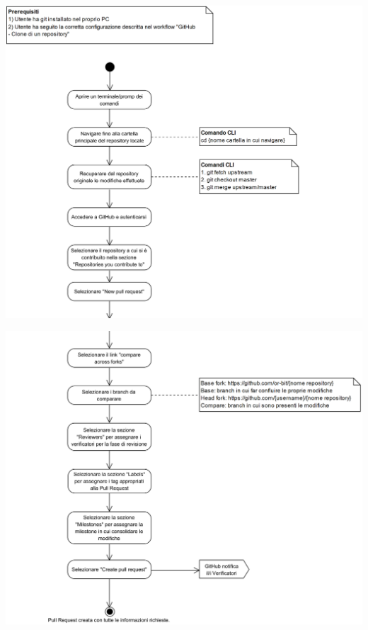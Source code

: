 \begin{center}
	\includegraphics[width=15cm]{./DiagrammiProcedure/GitHub-CreazionePullRequest1.png}
\end{center}


\begin{center}
	\includegraphics[width=15cm]{./DiagrammiProcedure/GitHub-CreazionePullRequest2.png}
\end{center}


